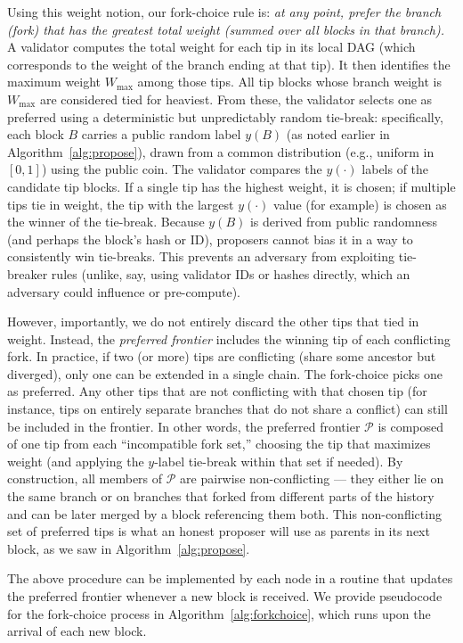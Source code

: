 Using this weight notion, our fork-choice rule is: \emph{at any point, prefer the branch (fork) that has the greatest total weight (summed over all blocks in that branch).} A validator computes the total weight for each tip in its local DAG (which corresponds to the weight of the branch ending at that tip). It then identifies the maximum weight $W_{\max}$ among those tips. All tip blocks whose branch weight is $W_{\max}$ are considered tied for heaviest. From these, the validator selects one as preferred using a deterministic but unpredictably random tie-break: specifically, each block $B$ carries a public random label $y(B)$ (as noted earlier in Algorithm~\ref{alg:propose}), drawn from a common distribution (e.g., uniform in $[0,1]$) using the public coin. The validator compares the $y(\cdot)$ labels of the candidate tip blocks. If a single tip has the highest weight, it is chosen; if multiple tips tie in weight, the tip with the largest $y(\cdot)$ value (for example) is chosen as the winner of the tie-break. Because $y(B)$ is derived from public randomness (and perhaps the block’s hash or ID), proposers cannot bias it in a way to consistently win tie-breaks. This prevents an adversary from exploiting tie-breaker rules (unlike, say, using validator IDs or hashes directly, which an adversary could influence or pre-compute).

However, importantly, we do not entirely discard the other tips that tied in weight. Instead, the \emph{preferred frontier} includes the winning tip of each conflicting fork. In practice, if two (or more) tips are conflicting (share some ancestor but diverged), only one can be extended in a single chain. The fork-choice picks one as preferred. Any other tips that are not conflicting with that chosen tip (for instance, tips on entirely separate branches that do not share a conflict) can still be included in the frontier. In other words, the preferred frontier $\mathcal{P}$ is composed of one tip from each ``incompatible fork set,'' choosing the tip that maximizes weight (and applying the $y$-label tie-break within that set if needed). By construction, all members of $\mathcal{P}$ are pairwise non-conflicting — they either lie on the same branch or on branches that forked from different parts of the history and can be later merged by a block referencing them both. This non-conflicting set of preferred tips is what an honest proposer will use as parents in its next block, as we saw in Algorithm~\ref{alg:propose}.

The above procedure can be implemented by each node in a routine that updates the preferred frontier whenever a new block is received. We provide pseudocode for the fork-choice process in Algorithm~\ref{alg:forkchoice}, which runs upon the arrival of each new block.

